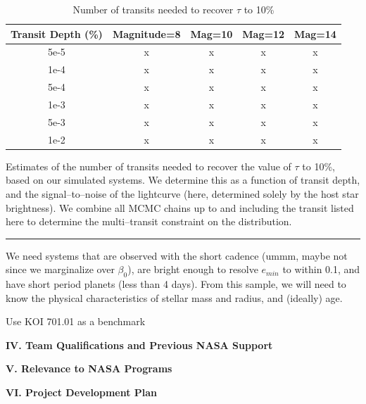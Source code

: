 \begin{table}[t]
\begin{center}
\caption{\label{table-taurun} Number of transits needed to recover $\tau$ to 10\%}
\begin{tabular}{c|cccc}
\hline \hline
Transit Depth (\%) & Magnitude=8 & Mag=10 & Mag=12 & Mag=14\\
\hline
5e-5 & x & x & x & x \\
1e-4 & x & x & x & x \\
5e-4 & x & x & x & x \\
1e-3 & x & x & x & x \\
5e-3 & x & x & x & x \\
1e-2 & x & x & x & x \\
\hline
\end{tabular}
\end{center}
Estimates of the number of transits needed to recover the value of
$\tau$ to 10\%, based on our simulated systems.  We determine this as
a function of transit depth, and the signal--to--noise of the
lightcurve (here, determined solely by the host star brightness).  We
combine all MCMC chains up to and including the transit listed here to
determine the multi--transit constraint on the distribution.
\hspace*{\fill} \\
\hrule
\end{table}

\medskip
{\centerline{}}
\smallskip

We need systems that are observed with the short cadence (ummm, maybe
not since we marginalize over $\beta_0$), are bright enough to resolve
$e_{min}$ to within 0.1, and have short period planets (less than 4
days).  From this sample, we will need to know the physical
characteristics of stellar mass and radius, and (ideally) age.

\medskip
{\centerline{}}
\smallskip

Use KOI 701.01 as a benchmark

\bigskip
\centerline{\bf IV. Team Qualifications and Previous NASA Support}
\smallskip

\bigskip
\centerline{\bf V. Relevance to NASA Programs}
\smallskip

\bigskip
\centerline{\bf VI. Project Development Plan}
\smallskip

